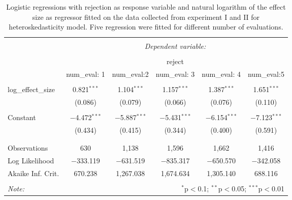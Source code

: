 \documentclass[]{interact}
\theoremstyle{plain}%
\theoremstyle{definition}
\theoremstyle{remark}
\begin{document}
\begin{table}[!htbp] \centering 
  \caption{Logistic regressions with rejection as response variable and natural logarithm of the effect size as regressor fitted on the data collected from experiment I and II for heteroskedasticity model. Five regression were fitted for different number of evaluations.} 
  \label{tab:powerglmheter} 
\begin{tabular}{@{\extracolsep{5pt}}lccccc} 
\\[-1.8ex]\hline 
\hline \\[-1.8ex] 
 & \multicolumn{5}{c}{\textit{Dependent variable:}} \\ 
\cline{2-6} 
\\[-1.8ex] & \multicolumn{5}{c}{reject} \\ 
 & num\_eval: 1 & num\_eval:2 & num\_eval: 3 & num\_eval: 4 & num\_eval:5 \\ 
\hline \\[-1.8ex] 
 log\_effect\_size & 0.821$^{***}$ & 1.104$^{***}$ & 1.157$^{***}$ & 1.387$^{***}$ & 1.651$^{***}$ \\ 
  & (0.086) & (0.079) & (0.066) & (0.076) & (0.110) \\ 
  & & & & & \\ 
 Constant & $-$4.472$^{***}$ & $-$5.887$^{***}$ & $-$5.431$^{***}$ & $-$6.154$^{***}$ & $-$7.123$^{***}$ \\ 
  & (0.434) & (0.415) & (0.344) & (0.400) & (0.591) \\ 
  & & & & & \\ 
\hline \\[-1.8ex] 
Observations & 630 & 1,138 & 1,596 & 1,662 & 1,416 \\ 
Log Likelihood & $-$333.119 & $-$631.519 & $-$835.317 & $-$650.570 & $-$342.058 \\ 
Akaike Inf. Crit. & 670.238 & 1,267.038 & 1,674.634 & 1,305.140 & 688.116 \\ 
\hline 
\hline \\[-1.8ex] 
\textit{Note:}  & \multicolumn{5}{r}{$^{*}$p$<$0.1; $^{**}$p$<$0.05; $^{***}$p$<$0.01} \\ 
\end{tabular} 
\end{table}
\end{document}
